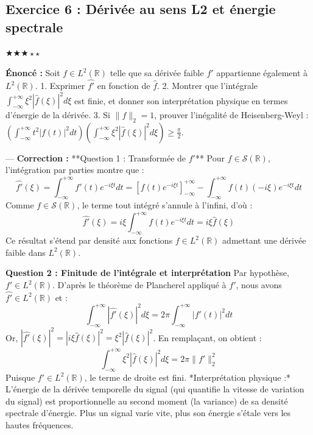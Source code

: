 \documentclass[11pt,a4paper]{article}
\begin{document}
\subsection*{Exercice 6 : Dérivée au sens L2 et énergie spectrale}
$\bigstar\bigstar\bigstar\star\star$

\textbf{Énoncé :}
Soit $f \in L^2(\mathbb{R})$ telle que sa dérivée faible $f'$ appartienne également à $L^2(\mathbb{R})$.
1. Exprimer $\widehat{f'}$ en fonction de $\hat{f}$.
2. Montrer que l'intégrale $\int_{-\infty}^{+\infty} \xi^2 |\hat{f}(\xi)|^2 d\xi$ est finie, et donner son interprétation physique en termes d'énergie de la dérivée.
3. Si $\|f\|_2 = 1$, prouver l'inégalité de Heisenberg-Weyl : $\left(\int_{-\infty}^{+\infty} t^2 |f(t)|^2 dt\right) \left(\int_{-\infty}^{+\infty} \xi^2 |\hat{f}(\xi)|^2 d\xi\right) \ge \frac{\pi}{2}$.

---
\textbf{Correction :}
**Question 1 : Transformée de $f'$**
Pour $f \in \mathcal{S}(\mathbb{R})$, l'intégration par parties montre que :
$$ \widehat{f'}(\xi) = \int_{-\infty}^{+\infty} f'(t) e^{-i\xi t} dt = \left[ f(t) e^{-i\xi t} \right]_{-\infty}^{+\infty} - \int_{-\infty}^{+\infty} f(t) (-i\xi) e^{-i\xi t} dt $$
Comme $f \in \mathcal{S}(\mathbb{R})$, le terme tout intégré s'annule à l'infini, d'où :
$$ \widehat{f'}(\xi) = i\xi \int_{-\infty}^{+\infty} f(t) e^{-i\xi t} dt = i\xi \hat{f}(\xi) $$
Ce résultat s'étend par densité aux fonctions $f \in L^2(\mathbb{R})$ admettant une dérivée faible dans $L^2(\mathbb{R})$.

\textbf{Question 2 : Finitude de l'intégrale et interprétation}
Par hypothèse, $f' \in L^2(\mathbb{R})$. D'après le théorème de Plancherel appliqué à $f'$, nous avons $\widehat{f'} \in L^2(\mathbb{R})$ et :
$$ \int_{-\infty}^{+\infty} |\widehat{f'}(\xi)|^2 d\xi = 2\pi \int_{-\infty}^{+\infty} |f'(t)|^2 dt $$
Or, $|\widehat{f'}(\xi)|^2 = |i\xi \hat{f}(\xi)|^2 = \xi^2 |\hat{f}(\xi)|^2$. En remplaçant, on obtient :
$$ \int_{-\infty}^{+\infty} \xi^2 |\hat{f}(\xi)|^2 d\xi = 2\pi \|f'\|_2^2 $$
Puisque $f' \in L^2(\mathbb{R})$, le terme de droite est fini.
*Interprétation physique :* L'énergie de la dérivée temporelle du signal (qui quantifie la vitesse de variation du signal) est proportionnelle au second moment (la variance) de sa densité spectrale d'énergie. Plus un signal varie vite, plus son énergie s'étale vers les hautes fréquences.
\end{document}
